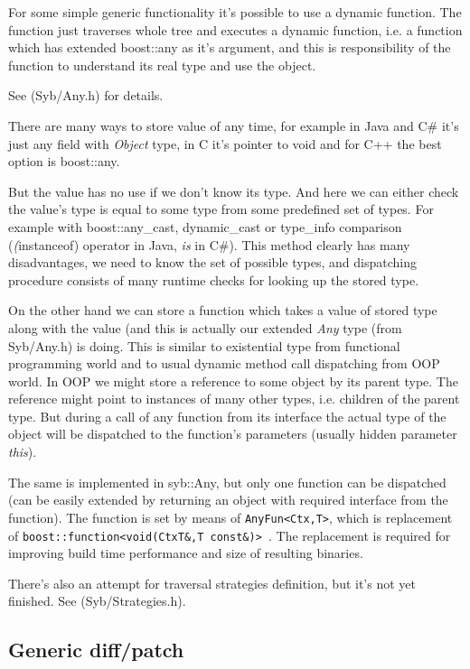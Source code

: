 \documentclass[a4paper]{article}
\begin{document}
For some simple generic functionality it's possible to use a dynamic function. The function
just traverses whole tree and executes a dynamic function, i.e. a function which has 
extended boost::any as it's argument, and this is responsibility of the function to 
understand its real type and use the object.

See (Syb/Any.h) for details.

There are many ways to store value of any time, for example in Java and C\# it's just any field
with \emph{Object} type, in C it's pointer to void and for C++ the best option is boost::any.

But the value has no use if we don't know its type. And here we can either check the value's type is 
equal to some type from some predefined set of types. For example with boost::any\_cast, dynamic\_cast 
or type\_info comparison (\emph(instanceof) operator in Java, \emph{is} in C\#). This method clearly
has many disadvantages, we need to know the set of possible types, and dispatching procedure consists
of many runtime checks for looking up the stored type.

On the other hand we can store a function which takes a value of stored type along with the value (and 
this is actually our extended \emph{Any} type (from Syb/Any.h) is doing. This is similar to existential type  
from functional programming world and to usual dynamic method call dispatching from OOP world. In OOP we
might store a reference to some object by its parent type. The reference might point to instances of many 
other types, i.e. children of the parent type. But during a call of any function from its interface the 
actual type of the object will be dispatched to the function's parameters (usually hidden parameter 
\emph{this}).

The same is implemented in syb::Any, but only one function can be dispatched (can be easily extended
by returning an object with required interface from the function). The function is set by means of 
\lstinline{AnyFun<Ctx,T>}, which is replacement of \lstinline{boost::function<void(CtxT&,T const&)> }. 
The replacement is required for improving build time performance and size of resulting binaries.

There's also an attempt for traversal strategies definition, but it's not yet finished.
See (Syb/Strategies.h).

\subsection{Generic diff/patch}
\end{document}
